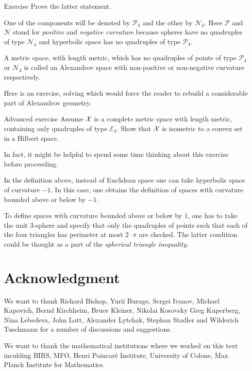 \begin{thm}{Exercise}\label{ex:two-components-of-M4}
Prove the latter statement.
\end{thm}


One of the components will be denoted by $\mathcal{P}_4$ and the other by $\mathcal{N}_4$.
Here $\mathcal{P}$ and $\mathcal{N}$ stand for {}\emph{positive} 
and {}\emph{negative curvature} because spheres have no quadruples of type $\mathcal{N}_4$ and 
hyperbolic space
has no quadruples of type $\mathcal{P}_4$.

A metric space, with length metric, 
which has no quadruples of points of type $\mathcal{P}_4$ or $\mathcal{N}_4$ 
is called an Alexandrov space with non-positive or non-negative curvature respectively.

Here is an exercise, solving which would force the reader to rebuild a considerable part of Alexandrov geometry.

\begin{thm}{Advanced exercise}\label{ex:convex-set}
Assume $\mathcal{X}$ is a complete metric space with length metric, 
containing only quadruples of type $\mathcal{E}_4$.
Show that $\mathcal{X}$ is isometric to a convex set in a Hilbert space.
\end{thm}

In fact, it might be helpful to spend some time thinking about this exercise before proceeding.

In the definition above, 
instead of  Euclidean space 
one can take  
hyperbolic space of curvature $-1$.
In this case,
one obtains the definition of spaces with curvature bounded above or below by $-1$.

To define spaces with curvature bounded above or below by $1$,
one has to take the unit 3-sphere 
and specify that only the quadruples of points such that each of the four triangles has perimeter 
 at most $2\cdot\pi$ are checked.
The latter condition could be thought as a part of the {}\emph{spherical triangle inequality}.


\section*{Acknowledgment}
We want to thank 
Richard Bishop,
Yurii Burago,
Sergei Ivanov,
Michael Kapovich, 
Bernd Kirchheim, 
Bruce Kleiner,
Nikolai Kosovsky
Greg Kuperberg,
Nina Lebedeva,
John Lott,
Alexander Lytchak,
Stephan Stadler
and 
Wilderich Tuschmann
for a number of discussions and suggestions.



We want to thank the mathematical institutions where we worked on this text inculding
BIRS, 
MFO, 
Henri Poincar\'{e} Institute,
University of Colone, 
Max Planck Institute for Mathematics.










